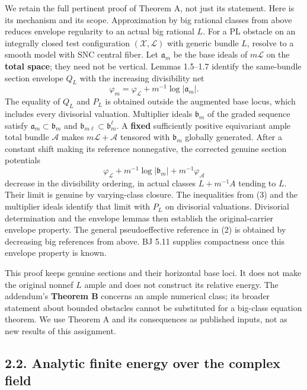 \documentclass[
  10pt,
]{article}
\begin{document}
We retain the full pertinent proof of Theorem A, not just its statement.
Here is its mechanism and its scope. Approximation by big rational
classes from above reduces envelope regularity to an actual big rational
\(L\). For a PL obstacle on an integrally closed test configuration
\((\mathcal X,\mathcal L)\) with generic bundle \(L\), resolve to a
smooth model with SNC central fiber. Let \(\mathfrak a_m\) be the base
ideals of \(m\mathcal L\) on the \textbf{total space}; they need not be
vertical. Lemmas 1.5--1.7 identify the same-bundle section envelope
\(Q_L\) with the increasing divisibility net \[
 \varphi_m=\varphi_{\mathcal L}+m^{-1}\log|\mathfrak a_m|.
 \tag{3}
\] The equality of \(Q_L\) and \(P_L\) is obtained outside the augmented
base locus, which includes every divisorial valuation. Multiplier ideals
\(\mathfrak b_m\) of the graded sequence satisfy
\(\mathfrak a_m\subset\mathfrak b_m\) and
\(\mathfrak b_{m\ell}\subset\mathfrak b_m^\ell\). A \textbf{fixed}
sufficiently positive equivariant ample total bundle \(\mathcal A\)
makes \(m\mathcal L+\mathcal A\) tensored with \(\mathfrak b_m\)
globally generated. After a constant shift making its reference
nonnegative, the corrected genuine section potentials \[
 \varphi_{\mathcal L}+m^{-1}\log|\mathfrak b_m|
       +m^{-1}\varphi_{\mathcal A}
 \tag{4}
\] decrease in the divisibility ordering, in actual classes
\(L+m^{-1}A\) tending to \(L\). Their limit is genuine by varying-class
closure. The inequalities from (3) and the multiplier ideals identify
that limit with \(P_L\) on divisorial valuations. Divisorial
determination and the envelope lemmas then establish the
original-carrier envelope property. The general pseudoeffective
reference in (2) is obtained by decreasing big references from above. BJ
5.11 supplies compactness once this envelope property is known.

This proof keeps genuine sections and their horizontal base loci. It
does not make the original nonnef \(L\) ample and does not construct its
relative energy. The addendum's \textbf{Theorem B} concerns an ample
numerical class; its broader statement about bounded obstacles cannot be
substituted for a big-class equation theorem. We use Theorem A and its
consequences as published inputs, not as new results of this assignment.

\subsection{2.2. Analytic finite energy over the complex
field}\label{analytic-finite-energy-over-the-complex-field}
\end{document}
